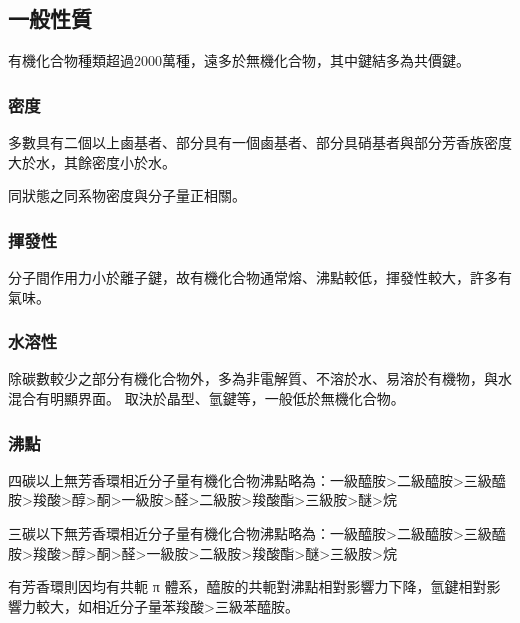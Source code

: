 \documentclass[a4paper,12pt]{report}
\begin{document}
\subsection{一般性質}
有機化合物種類超過2000萬種，遠多於無機化合物，其中鍵結多為共價鍵。
\subsubsection{密度}
多數具有二個以上鹵基者、部分具有一個鹵基者、部分具硝基者與部分芳香族密度大於水，其餘密度小於水。

同狀態之同系物密度與分子量正相關。
\subsubsection{揮發性}
分子間作用力小於離子鍵，故有機化合物通常熔、沸點較低，揮發性較大，許多有氣味。
\subsubsection{水溶性}
除碳數較少之部分有機化合物外，多為非電解質、不溶於水、易溶於有機物，與水混合有明顯界面。
取決於晶型、氫鍵等，一般低於無機化合物。
\subsubsection{沸點}
四碳以上無芳香環相近分子量有機化合物沸點略為：一級醯胺>二級醯胺>三級醯胺>羧酸>醇>酮>一級胺>醛>二級胺>羧酸酯>三級胺>醚>烷

三碳以下無芳香環相近分子量有機化合物沸點略為：一級醯胺>二級醯胺>三級醯胺>羧酸>醇>酮>醛>一級胺>二級胺>羧酸酯>醚>三級胺>烷

有芳香環則因均有共軛 π 體系，醯胺的共軛對沸點相對影響力下降，氫鍵相對影響力較大，如相近分子量苯羧酸>三級苯醯胺。
\end{document}
